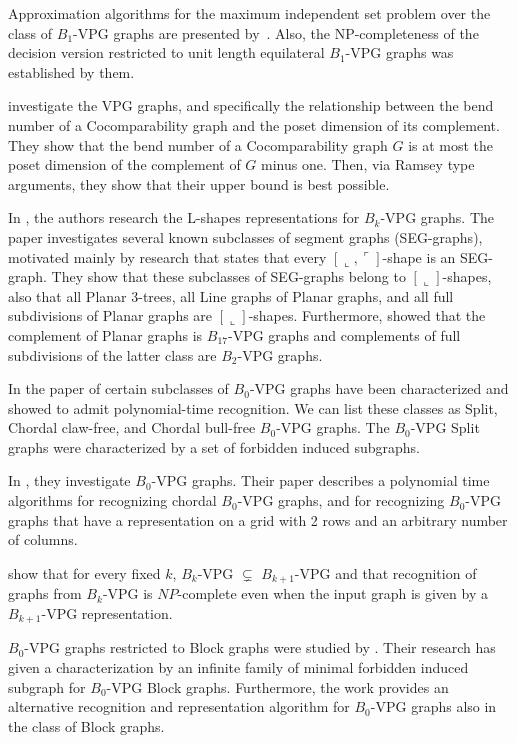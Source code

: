 Approximation algorithms for the maximum independent set problem over the class of $B_1$-VPG graphs are presented by~\citet{lahiri2015maximum}. Also, the NP-completeness of the decision version restricted to unit length equilateral   $B_1$-VPG graphs was established by them.

\citet{cohen2016posets} investigate the VPG graphs, and specifically the relationship between the bend number of a Cocomparability graph and the poset dimension of its complement. They show that the bend number of a Cocomparability graph $G$ is at most the poset dimension of the complement of $G$ minus one. Then, via Ramsey type arguments, they show that their upper bound is best  possible.


In \citet{felsner2016intersection}, the authors research the L-shapes representations for $B_k$-VPG graphs. The paper investigates several known subclasses of segment graphs (SEG-graphs), motivated mainly by research \cite{middendorf1992max} that states that every $[\llcorner, \ulcorner]$-shape is an SEG-graph.
They show that these subclasses of SEG-graphs belong to $[\llcorner]$-shapes, also that all Planar 3-trees, all Line graphs of Planar graphs, and all full subdivisions of Planar graphs are $[\llcorner]$-shapes. Furthermore,  \citet{felsner2016intersection} showed that the complement of Planar graphs is $B_{17}$-VPG graphs and complements of  full subdivisions of the latter class are $B_2$-VPG graphs. 

In the paper of \citet{golumbic2013intersection} certain subclasses of $B_0$-VPG graphs have been characterized and showed to admit polynomial-time recognition. We can list these classes as Split, Chordal claw-free, and Chordal bull-free $B_0$-VPG graphs.
The $B_0$-VPG Split graphs were characterized by  a set of forbidden induced subgraphs. %


In \citet{chaplick2011recognizing}, they investigate  $B_0$-VPG graphs. Their paper describes a polynomial time
algorithms for recognizing chordal $B_0$-VPG graphs, and for recognizing $B_0$-VPG graphs that have a representation on a grid with 2 rows and an arbitrary number of columns.

\citet{chaplick2012bend} show  that for every fixed $k$, $B_k$-VPG $\subsetneq$ $B_{k+1}$-VPG and that recognition of graphs from $B_k$-VPG is $NP$-complete even when the input graph is given by a $B_{k+1}$-VPG representation. 


$B_0$-VPG graphs restricted to Block graphs were studied by \citet{Alcn2017VertexIG}. Their research has given a characterization by an infinite family of minimal forbidden induced subgraph  for $B_0$-VPG Block graphs. Furthermore, the work provides an alternative recognition and representation algorithm for $B_0$-VPG graphs also in the class of Block graphs.

